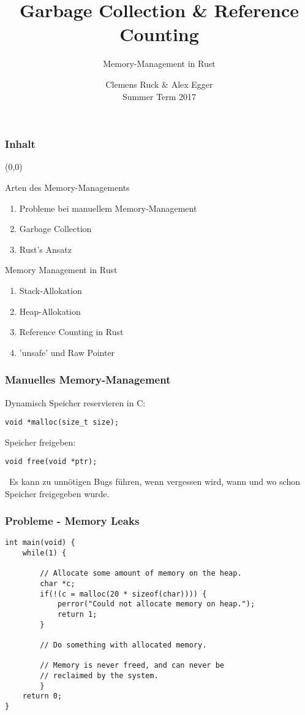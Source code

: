 \documentclass{beamer}
\title{Garbage Collection \& Reference Counting}
\author{Memory-Management in Rust}
\institute[TUM]{
	\vspace{-15em}\tumheader\vspace{18em}
}
\date{Clemens Ruck \& Alex Egger \\ Summer Term 2017}
\newcommand{\attention}{{\scalebox{.75}{\bf}}\ }
\begin{document}
\maketitle
\begin{frame}
	\frametitle{Inhalt}
	\begin{textblock}{6}(0,0)
		\begin{alertblock}{Arten des Memory-Managements}
			\begin{enumerate}
				\item Probleme bei manuellem Memory-Management
				\item Garbage Collection
				\item Rust's Ansatz
			\end{enumerate}
		\end{alertblock}
		\begin{alertblock}{Memory Management in Rust}
			\begin{enumerate}
				\item Stack-Allokation
				\item Heap-Allokation
				\item Reference Counting in Rust
				\item 'unsafe' und Raw Pointer
			\end{enumerate}
		\end{alertblock}
	\end{textblock}
\end{frame}
\begin{frame}[fragile]
	\frametitle{Manuelles Memory-Management}
	Dynamisch Speicher reservieren in C:
	\begin{verbatim}
void *malloc(size_t size);
	\end{verbatim}
	Speicher freigeben:
	\begin{verbatim}
void free(void *ptr);
	\end{verbatim}
	\vspace{1cm}
	\attention Es kann zu unnötigen Bugs führen, wenn vergessen wird, wann und wo schon Speicher freigegeben wurde.
\end{frame}
\begin{frame}[fragile]
	\frametitle{Probleme - Memory Leaks}
	\begin{verbatim}
int main(void) {
	while(1) {

		// Allocate some amount of memory on the heap.
		char *c;
		if(!(c = malloc(20 * sizeof(char)))) {
			perror("Could not allocate memory on heap.");
			return 1;
		}

		// Do something with allocated memory.

		// Memory is never freed, and can never be
		// reclaimed by the system.
		}
	return 0;
}
	\end{verbatim}
\end{frame}
\end{document}
